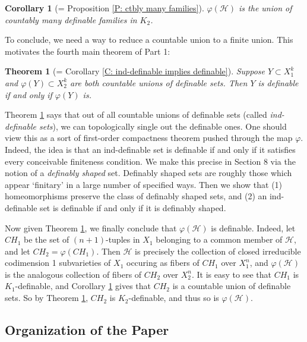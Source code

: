 \documentclass{amsart}
\newtheorem{corollary}[theorem]{Corollary}
\newtheorem{alphthm}{Theorem}
\theoremstyle{definition}
\begin{document}
\begin{corollary}[= Proposition \ref{P: ctbly many families}]\label{C: intro ind definable}
    $\varphi(\mathcal H)$ is the union of countably many definable families in $K_2$.
\end{corollary}

To conclude, we need a way to reduce a countable union to a finite union. This motivates the fourth main theorem of Part 1:

\begin{alphthm}[= Corollary \ref{C: ind-definable implies definable}]\label{T: intro definably shaped} Suppose $Y\subset X_1^k$ and $\varphi(Y)\subset X_2^k$ are both countable unions of definable sets. Then $Y$ is definable if and only if $\varphi(Y)$ is.
\end{alphthm}

Theorem \ref{T: intro definably shaped} says that out of all countable unions of definable sets (called \textit{ind-definable sets}), we can topologically single out the definable ones. One should view this as a sort of first-order compactness theorem pushed through the map $\varphi$. Indeed, the idea is that an ind-definable set is definable if and only if it satisfies every conceivable finiteness condition. We make this precise in Section 8 via the notion of a \textit{definably shaped} set. Definably shaped sets are roughly those which appear `finitary' in a large number of specified ways. Then we show that (1) homeomorphisms preserve the class of definably shaped sets, and (2) an ind-definable set is definable if and only if it is definably shaped.

Now given Theorem \ref{T: intro definably shaped}, we finally conclude that $\varphi(\mathcal H)$ is definable. Indeed, let $CH_1$ be the set of $(n+1)$-tuples in $X_1$ belonging to a common member of $\mathcal H$, and let $CH_2=\varphi(CH_1)$. Then $\mathcal H$ is precisely the collection of closed irreducible codimension 1 subvarieties of $X_1$ occuring as fibers of $CH_1$ over $X_1^n$, and $\varphi(\mathcal H)$ is the analogous collection of fibers of $CH_2$ over $X_2^n$. It is easy to see that $CH_1$ is $K_1$-definable, and Corollary \ref{C: intro ind definable} gives that $CH_2$ is a countable union of definable sets. So by Theorem \ref{T: intro definably shaped}, $CH_2$ is $K_2$-definable, and thus so is $\varphi(\mathcal H)$. 

\subsection{Organization of the Paper}
\end{document}
